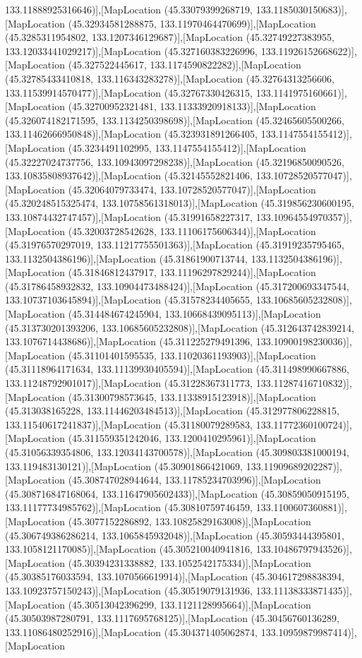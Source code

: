 133.11888925316646)],[MapLocation (45.33079399268719, 133.1185030150683)],[MapLocation (45.32934581288875, 133.11970464470699)],[MapLocation (45.3285311954802, 133.1207346129687)],[MapLocation (45.32749227383955, 133.12033441029217)],[MapLocation (45.327160383226996, 133.11926152668622)],[MapLocation (45.327522445617, 133.1174590822282)],[MapLocation (45.32785433410818, 133.116343283278)],[MapLocation (45.32764313256606, 133.11539914570477)],[MapLocation (45.32767330426315, 133.1141975160661)],[MapLocation (45.32700952321481, 133.11333920918133)],[MapLocation (45.326074182171595, 133.1134250398698)],[MapLocation (45.32465605500266, 133.11462666950848)],[MapLocation (45.323931891266405, 133.1147554155412)],[MapLocation (45.3234491102995, 133.1147554155412)],[MapLocation (45.32227024737756, 133.10943097298238)],[MapLocation (45.32196850090526, 133.10835808937642)],[MapLocation (45.32145552821406, 133.10728520577047)],[MapLocation (45.32064079733474, 133.10728520577047)],[MapLocation (45.320248515325474, 133.10758561318013)],[MapLocation (45.319856230600195, 133.10874432747457)],[MapLocation (45.31991658227317, 133.10964554970357)],[MapLocation (45.32003728542628, 133.11106175606344)],[MapLocation (45.31976570297019, 133.11217755501363)],[MapLocation (45.31919235795465, 133.1132504386196)],[MapLocation (45.31861900713744, 133.1132504386196)],[MapLocation (45.31846812437917, 133.11196297829244)],[MapLocation (45.31786458932832, 133.10904473488424)],[MapLocation (45.317200693347544, 133.10737103645894)],[MapLocation (45.31578234405655, 133.10685605232808)],[MapLocation (45.314484674245904, 133.10668439095113)],[MapLocation (45.313730201393206, 133.10685605232808)],[MapLocation (45.312643742839214, 133.1076714438686)],[MapLocation (45.311225279491396, 133.10900198230036)],[MapLocation (45.31101401595535, 133.11020361193903)],[MapLocation (45.31118964171634, 133.11139930405594)],[MapLocation (45.311498990667886, 133.11248792901017)],[MapLocation (45.31228367311773, 133.11287416710832)],[MapLocation (45.31300798573645, 133.11338915123918)],[MapLocation (45.313038165228, 133.11446203484513)],[MapLocation (45.312977806228815, 133.11540617241837)],[MapLocation (45.31180079289583, 133.11772360100724)],[MapLocation (45.311559351242046, 133.1200410295961)],[MapLocation (45.31056339354806, 133.12034143700578)],[MapLocation (45.309803381000194, 133.119483130121)],[MapLocation (45.30901866421069, 133.11909689202287)],[MapLocation (45.308747028944644, 133.11785234703996)],[MapLocation (45.308716847168064, 133.11647905602433)],[MapLocation (45.30859050915195, 133.11177734985762)],[MapLocation (45.30810759746459, 133.1100607360881)],[MapLocation (45.3077152286892, 133.10825829163008)],[MapLocation (45.306749386286214, 133.1065845932048)],[MapLocation (45.30593444395801, 133.1058121170085)],[MapLocation (45.305210040941816, 133.10486797943526)],[MapLocation (45.30394231338882, 133.1052542175334)],[MapLocation (45.30385176033594, 133.1070566619914)],[MapLocation (45.304617298838394, 133.10923757150243)],[MapLocation (45.30519079131936, 133.11138333871435)],[MapLocation (45.30513042396299, 133.1121128995664)],[MapLocation (45.30503987280791, 133.1117695768125)],[MapLocation (45.30456760136289, 133.11086480252916)],[MapLocation (45.304371405062874, 133.10959879987414)],[MapLocation 